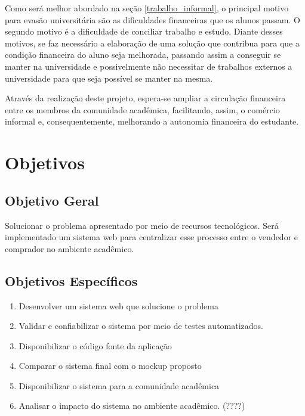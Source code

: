 Como será melhor abordado na seção \ref{trabalho_informal}, o principal motivo para evasão universitária são as dificuldades financeiras que os alunos passam. O segundo motivo é a dificuldade de conciliar trabalho e estudo. Diante desses motivos, se faz necessário a elaboração de uma solução que contribua para que a condição financeira do aluno seja melhorada, passando assim a conseguir se manter na universidade e possivelmente não necessitar de trabalhos externos a universidade para que seja possível se manter na mesma.

Através da realização deste projeto, espera-se ampliar a circulação financeira entre os membros da comunidade acadêmica, facilitando, assim, o comércio informal e, consequentemente, melhorando a autonomia financeira do estudante.

\section{Objetivos}

\subsection{Objetivo Geral}

Solucionar o problema apresentado por meio de recursos tecnológicos. Será implementado um sistema web para centralizar esse processo entre o vendedor e comprador no ambiente acadêmico.

\subsection{Objetivos Específicos}
\begin{enumerate}
    \item Desenvolver um sistema web que solucione o problema
    \item Validar e confiabilizar o sistema por meio de testes automatizados.
    \item Disponibilizar o código fonte da aplicação
    \item Comparar o sistema final com o mockup proposto
    \item Disponibilizar o sistema para a comunidade acadêmica
    \item Analisar o impacto do sistema no ambiente acadêmico. (????)
\end{enumerate}


